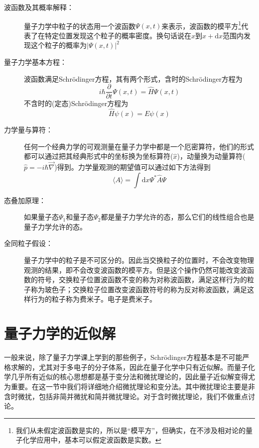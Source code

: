 \documentclass[12pt,a4paper,openany,twoside]{book}
\numberwithin{equation}{section}
\newcommand{\sch}{Schr\"odinger}
\begin{document}
        \begin{description}
          \item[波函数及其概率解释：]量子力学中粒子的状态用一个波函数$\Psi(x,t)$来表示，波函数的模平方\footnote{我们从未假定波函数是实的，所以是“模平方”，但确实，在不涉及相对论的量子化学应用中，基本可以假定波函数是实数。}代表了在特定位置发现这个粒子的概率密度。换句话说在$x$到$x+\mathrm{d}x$范围内发现这个粒子的概率为$\left|\Psi(x,t)\right|^2$
          
          \item[量子力学基本方程：]波函数满足\sch 方程，其有两个形式，含时的\sch 方程为
          \begin{equation}
            i\hbar \frac{\partial}{\partial t}\Psi(x,t) = \hat{H} \Psi(x,t)
          \end{equation}
          不含时的(定态)\sch 方程为
          \begin{equation}
            \hat{H} \psi(x) = E\psi(x)
          \end{equation}
          
          \item[力学量与算符：]任何一个经典力学的可观测量在量子力学中都是一个厄密算符，他们的形式都可以通过把其经典形式中的坐标换为坐标算符($\hat{x}$)，动量换为动量算符($\hat{p} = -i\hbar \vec{\nabla}$)得到。力学量观测的期望值可以通过如下方法得到
          \begin{equation}
            \langle A\rangle = \int \mathrm{d}x \Psi^{*}\hat{A}\Psi 
          \end{equation}
          
          \item[态叠加原理：]如果量子态$\Psi_1$和量子态$\Psi_2$都是量子力学允许的态，那么它们的线性组合也是量子力学允许的态。
          
          \item[全同粒子假设：]量子力学中的粒子是不可区分的。因此当交换粒子的位置时，不会改变物理观测的结果，即不会改变波函数的模平方。但是这个操作仍然可能改变波函数的符号，交换粒子位置波函数不变的称为对称波函数，满足这样行为的粒子称为玻色子；交换粒子位置改变波函数符号的称为反对称波函数，满足这样行为的粒子称为费米子。电子是费米子。  
        \end{description}
      \section{量子力学的近似解}
        一般来说，除了量子力学课上学到的那些例子，\sch 方程基本是不可能严格求解的，尤其对于多电子的分子体系，因此在量子化学中只有近似解。而量子化学几乎所有近似的核心思想都是基于变分法和微扰理论的，因此量子近似解变得尤为重要。在这一节中我们将详细地介绍微扰理论和变分法。其中微扰理论主要是非含时微扰，包括非简并微扰和简并微扰理论。对于含时微扰理论，我们不做重点讨论。
\end{document}
